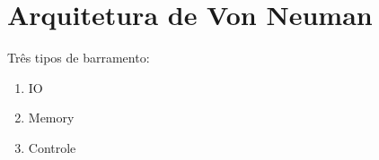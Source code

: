 \documentclass[a4paper, 12pt]{article}
\begin{document}
\section{Arquitetura de Von Neuman}

Três tipos de barramento:

\begin{enumerate}
  \item IO %
  \item Memory %
  \item Controle %
\end{enumerate}
\end{document}
